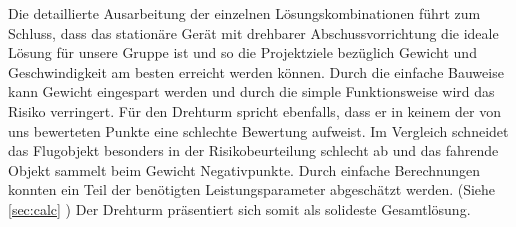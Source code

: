 \noindent Die detaillierte Ausarbeitung der einzelnen Lösungskombinationen führt
zum Schluss, dass das stationäre Gerät mit drehbarer 
Abschussvorrichtung die ideale Lösung für unsere Gruppe ist und so die 
Projektziele bezüglich Gewicht und Geschwindigkeit am besten erreicht werden können. 
Durch die einfache Bauweise kann Gewicht eingespart werden und durch die simple 
Funktionsweise wird das Risiko verringert. Für den Drehturm spricht ebenfalls, 
dass er in keinem der von uns bewerteten Punkte eine schlechte Bewertung aufweist.
Im Vergleich schneidet das Flugobjekt besonders in der Risikobeurteilung schlecht ab 
und das fahrende Objekt sammelt beim Gewicht Negativpunkte. Durch einfache 
Berechnungen konnten ein Teil der benötigten Leistungsparameter abgeschätzt 
werden. (Siehe \autoref{sec:calc} )
Der Drehturm präsentiert sich somit als solideste Gesamtlösung.

